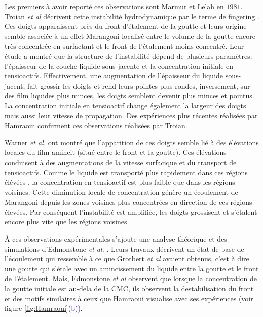 Les premiers à avoir reporté ces observations sont Marmur et Lelah \cite{Marmur1981} en $1981$. Troian \textit{et al} décrivent cette instabilité hydrodynamique par le terme de \og fingering \fg \cite{Troian1989}. Ces doigts apparaissent près du front d'étalement de la goutte et leurs origine semble associée à un effet Marangoni localisé entre le volume de la goutte encore très concentrée en surfactant et le front de l'étalement moins concentré. Leur étude a montré que la structure de l'instabilité dépend de plusieurs paramètres: l'épaisseur de la couche liquide sous-jacente et la concentration initiale en tensioactifs. Effectivement, une augmentation de l'épaisseur du liquide sous-jacent, fait grossir les doigts et rend leurs pointes plus rondes, inversement, sur des film liquides plus minces, les doigts semblent devenir plus minces et pointus. La concentration initiale en tensioactif change également la largeur des doigts mais aussi leur vitesse de propagation. Des expériences plus récentes réalisées par Hamraoui \cite{Hamraoui2004} confirment ces observations réalisées par Troian.

Warner \textit{et al.} \cite{Warner2004a, Warner2004b} ont montré que l'apparition de ces doigts semble lié à des élévations locales du film amincit (situé entre le front et la goutte). Ces élévations conduisent à des augmentations de la vitesse surfacique et du transport de tensioactifs. Comme le liquide est transporté plus rapidement dans ces régions \og élévées \fg, la concentration en tensioactif est plus faible que dans les régions voisines. Cette diminution locale de concentration génère un écoulement de Marangoni depuis les zones voisines plus concentrées en direction de ces régions élevées. Par conséquent l'instabilité est amplifiée, les doigts grossisent et s'étalent encore plus vite que les régions voisines.

À ces observations expérimentales s'ajoute une analyse théorique et des simulations d'Edmonstone \textit{et al.} \cite{Edmonstone2006}. Leurs travaux décrivent un état de base de l'écoulement qui ressemble à ce que Grotbert \textit{et al} avaient obtenus, c'est à dire une goutte qui s'étale avec un amincissement du liquide entre la goutte et le front de l'étalement. Mais, Edmonstone \textit{et al} observent que lorsque la concentration de la goutte initiale est au-dela de la CMC, ils observent la destabilisation du front et des motifs similaires à ceux que Hamraoui visualise avec ses expériences (voir figure \ref{fig:Hamraoui}\textcolor{blue}{(b)}).

